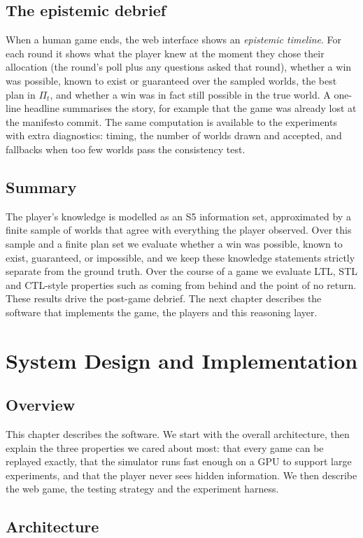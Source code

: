 \documentclass[11pt,a4paper,oneside]{report}
\newcommand{\overviewsection}{\section{Overview}}
\newcommand{\summarysection}{\section{Summary}}
\begin{document}
\section{The epistemic debrief}

When a human game ends, the web interface shows an \emph{epistemic timeline}. For each round it shows what
the player knew at the moment they chose their allocation (the round's poll plus any questions asked that
round), whether a win was possible, known to exist or guaranteed over the sampled worlds, the best plan in
$\Pi_t$, and whether a win was in fact still possible in the true world. A one-line headline summarises the
story, for example that the game was already lost at the manifesto commit. The same computation is
available to the experiments with extra diagnostics: timing, the number of worlds drawn and accepted, and
fallbacks when too few worlds pass the consistency test.

\summarysection

The player's knowledge is modelled as an S5 information set, approximated by a finite sample of worlds that
agree with everything the player observed. Over this sample and a finite plan set we evaluate whether a win
was possible, known to exist, guaranteed, or impossible, and we keep these knowledge statements strictly
separate from the ground truth. Over the course of a game we evaluate LTL, STL and CTL-style properties
such as coming from behind and the point of no return. These results drive the post-game debrief. The next
chapter describes the software that implements the game, the players and this reasoning layer.

\chapter{System Design and Implementation}\label{ch:system}

\overviewsection

This chapter describes the software. We start with the overall architecture, then explain the three
properties we cared about most: that every game can be replayed exactly, that the simulator runs fast
enough on a GPU to support large experiments, and that the player never sees hidden information. We then
describe the web game, the testing strategy and the experiment harness.

\section{Architecture}
\end{document}
